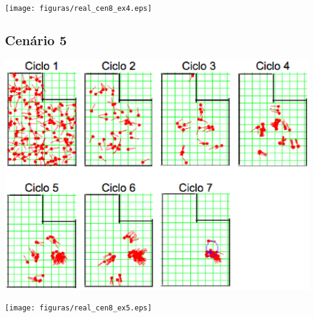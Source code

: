 {\centering
\texttt{[image: figuras/real\_cen8\_ex4.eps]}
\label{img:real_cen8_ex4}
\par}

\subsection{Cenário 5}

{\centering
\includegraphics[scale=0.4]{figuras/cen8_ex5.eps}
\label{img:cen8_ex5}
\par}

{\centering
\texttt{[image: figuras/real\_cen8\_ex5.eps]}
\label{img:real_cen8_ex5}
\par}
